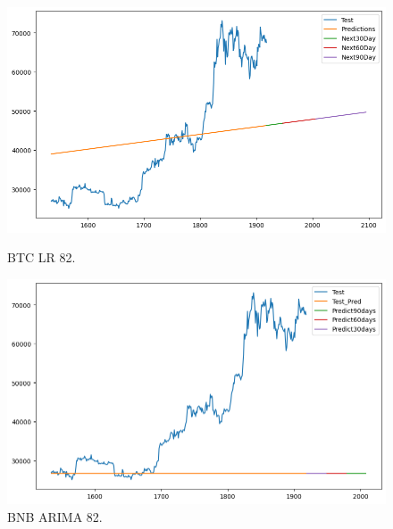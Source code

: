 \documentclass{ieeeojies}
\begin{document}
\begin{figure}[H]
  \centering
  \begin{minipage}{0.48\linewidth}
    \centering
    \includegraphics[width=1\linewidth]{image/BTC_LR_82.png}
    \caption{BTC LR 82.}
  \end{minipage}
\hfill
  \begin{minipage}{0.48\linewidth}
    \centering
    \includegraphics[width=1\linewidth]{image/BTC_ARIMA_82.png}
    \caption{BNB ARIMA 82.}
  \end{minipage}  
\end{figure}
\end{document}
